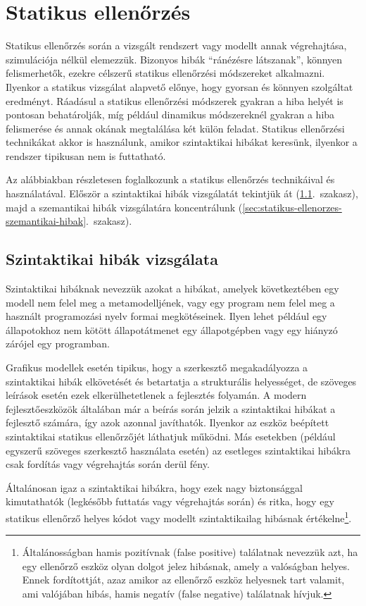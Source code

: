 \section{Statikus ellenőrzés}\label{sec:statikus-ellenorzes}
Statikus ellenőrzés során a vizsgált rendszert vagy modellt annak végrehajtása, szimulációja nélkül elemezzük. Bizonyos hibák ``ránézésre látszanak'', könnyen felismerhetők, ezekre célszerű statikus ellenőrzési módszereket alkalmazni. Ilyenkor a statikus vizsgálat alapvető előnye, hogy gyorsan és könnyen szolgáltat eredményt. Ráadásul a statikus ellenőrzési módszerek gyakran a hiba helyét is pontosan behatárolják, míg például dinamikus módszereknél gyakran a hiba felismerése és annak okának megtalálása két külön feladat. Statikus ellenőrzési technikákat akkor is használunk, amikor szintaktikai hibákat keresünk, ilyenkor a rendszer tipikusan nem is futtatható.

Az alábbiakban részletesen foglalkozunk a statikus ellenőrzés technikáival és használatával. Először a szintaktikai hibák vizsgálatát tekintjük át (\ref{sec:statikus-ellenorzes-szintaktikai-hibak}.~szakasz), majd a szemantikai hibák vizsgálatára koncentrálunk (\ref{sec:statikus-ellenorzes-szemantikai-hibak}.~szakasz). 

\subsection{Szintaktikai hibák vizsgálata}\label{sec:statikus-ellenorzes-szintaktikai-hibak}

Szintaktikai hibáknak nevezzük azokat a hibákat, amelyek következtében egy modell nem felel meg a metamodelljének, vagy egy program nem felel meg a használt programozási nyelv formai megkötéseinek. Ilyen lehet például egy állapotokhoz nem kötött állapotátmenet egy állapotgépben vagy egy hiányzó zárójel egy programban.

Grafikus modellek esetén tipikus, hogy a szerkesztő megakadályozza a szintaktikai hibák elkövetését és betartatja a strukturális helyességet, de szöveges leírások esetén ezek elkerülhetetlenek a fejlesztés folyamán. A modern fejlesztőeszközök általában már a beírás során jelzik a szintaktikai hibákat a fejlesztő számára, így azok azonnal javíthatók. Ilyenkor az eszköz beépített szintaktikai statikus ellenőrzőjét láthatjuk működni. Más esetekben (például egyszerű szöveges szerkesztő használata esetén) az esetleges szintaktikai hibákra csak fordítás vagy végrehajtás során derül fény.

Általánosan igaz a szintaktikai hibákra, hogy ezek nagy biztonsággal kimutathatók (legkésőbb futtatás vagy végrehajtás során) és ritka, hogy egy statikus ellenőrző helyes kódot vagy modellt szintaktikailag hibásnak értékelne\footnote{Általánosságban hamis pozitívnak (false positive) találatnak nevezzük azt, ha egy ellenőrző eszköz olyan dolgot jelez hibásnak, amely a valóságban helyes. Ennek fordítottját, azaz amikor az ellenőrző eszköz helyesnek tart valamit, ami valójában hibás, hamis negatív (false negative) találatnak hívjuk.\kiegeszitoanyag}.


